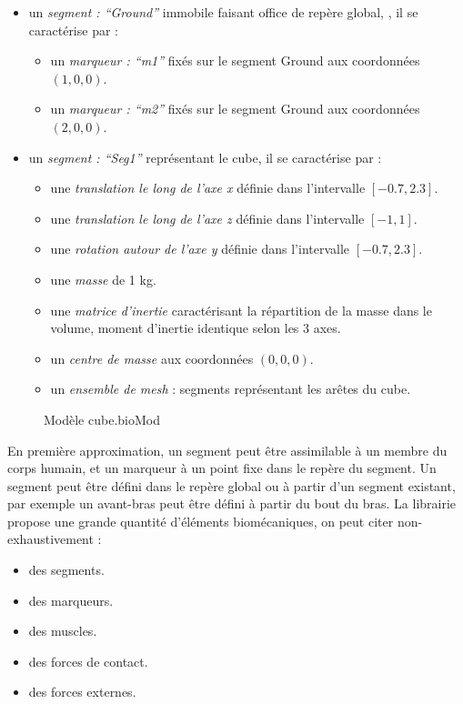 \begin{itemize}
\item un \emph{segment : ``Ground''} immobile faisant office de repère global, , il se caractérise par :
    \begin{itemize}
    \vspace{-0.5em}
    \setlength\itemsep{-0.2em}
    \item un \emph{marqueur : ``m1''} fixés sur le segment Ground aux coordonnées $(1, 0, 0)$.
    \item un \emph{marqueur : ``m2''} fixés sur le segment Ground aux coordonnées $(2, 0, 0)$.
    \end{itemize}
\item un \emph{segment : ``Seg1''} représentant le cube, il se caractérise par :
    \begin{itemize}
    \vspace{-0.5em}
    \setlength\itemsep{-0.2em}
    \item une \emph{translation le long de l'axe x} définie dans l'intervalle $[-0.7, 2.3]$.
    \item une \emph{translation le long de l'axe z} définie dans l'intervalle $[-1, 1]$.
    \item une \emph{rotation autour de l'axe y} définie dans l'intervalle $[-0.7, 2.3]$.
    \item une \emph{masse} de 1 kg.
    \item une \emph{matrice d'inertie} caractérisant la répartition de la masse dans le volume, moment d’inertie identique selon les 3 axes.
    \item un \emph{centre de masse} aux coordonnées $(0, 0, 0)$.
    \item un \emph{ensemble de mesh} : segments représentant les arêtes du cube.
    \end{itemize}
\end{itemize}

\newpage


\vspace{-0.6cm}
\begin{figure}[h]
\caption{Modèle cube.bioMod}
\end{figure}

En première approximation, un segment peut être assimilable à un membre du corps humain, et un marqueur à un point fixe dans le repère du segment. Un segment peut être défini dans le repère global ou à partir d'un segment existant, par exemple un avant-bras peut être défini à partir du bout du bras. La librairie propose une grande quantité d'éléments biomécaniques, on peut citer non-exhaustivement :
\begin{itemize}
\setlength\itemsep{-0.5em}
\item des segments.
\item des marqueurs.
\item des muscles.
\item des forces de contact.
\item des forces externes.
\end{itemize}

